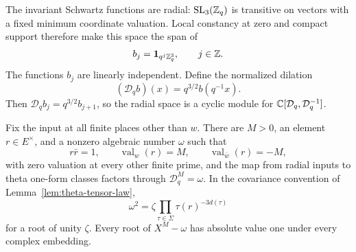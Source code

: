 The invariant Schwartz functions are radial: \(\operatorname{SL}_3(\mathbb{Z}_q)\) is
transitive on vectors with a fixed minimum coordinate valuation.
Local constancy at zero and compact support therefore make this
space the span of
\[
b_j=\mathbf 1_{q^j\mathbb{Z}_q^3},\qquad j\in\mathbb{Z}.
\]
The functions \(b_j\) are linearly independent.  Define the
normalized dilation
\begin{equation}\label{eq:radial-dilation}
(\mathcal D_q b)(x)=q^{3/2}b(q^{-1}x).
\end{equation}
Then \(\mathcal D_qb_j=q^{3/2}b_{j+1}\), so the radial space is a
cyclic module for \(\mathbb{C}[\mathcal D_q,\mathcal D_q^{-1}]\).

\begin{lemma}\label{lem:scalar-radial-relation}
Fix the input at all finite places other than \(w\).  There are
\(M>0\), an element \(r\in E^\times\), and a nonzero algebraic
number \(\omega\) such that
\[
r\bar r=1,\qquad
\operatorname{val}_{w}(r)=M,\qquad
\operatorname{val}_{\bar w}(r)=-M,
\]
with zero valuation at every other finite prime, and the map from
radial inputs to theta one-form classes factors through
\(\mathcal D_q^M=\omega\).  In the covariance convention of
Lemma~\ref{lem:theta-tensor-law},
\begin{equation}\label{eq:radial-scalar-weight}
\omega^2=\zeta\prod_{\tau\in\Sigma}\tau(r)^{-3d(\tau)}
\end{equation}
for a root of unity \(\zeta\).  Every root of \(X^M-\omega\) has
absolute value one under every complex embedding.
\end{lemma}

